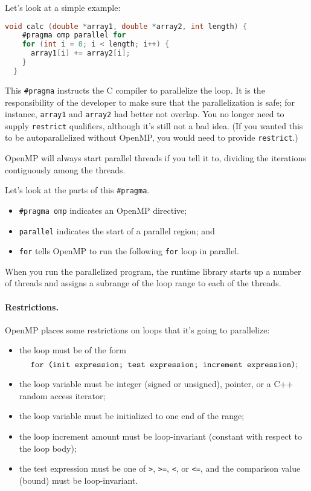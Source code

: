 Let's look at a simple example:
{\small
\begin{lstlisting}[language=C,morekeywords={foreach,pragma,omp,parallel,single,nowait,task,untied,barrier,taskyield}]
  void calc (double *array1, double *array2, int length) {
    #pragma omp parallel for
    for (int i = 0; i < length; i++) {
      array1[i] += array2[i];
    }
  }
\end{lstlisting}
}
This \verb+#pragma+ instructs the C compiler to parallelize the
loop. It is the responsibility of the developer to make sure that
the parallelization is safe; for instance, {\tt array1} and {\tt array2}
had better not overlap. You no longer need to supply {\tt restrict}
qualifiers, although it's still not a bad idea. (If you wanted this
to be autoparallelized without OpenMP, you would need to provide
{\tt restrict}.)

OpenMP will always start parallel threads if you tell it to, dividing
the iterations contiguously among the threads.

Let's look at the parts of this \verb+#pragma+.
\begin{itemize}
\item \verb+#pragma omp+ indicates an OpenMP directive;
\item {\tt parallel} indicates the start of a parallel region; and
\item {\tt for} tells OpenMP to run the following {\tt for} loop in parallel.
\end{itemize}
When you run the parallelized program, the runtime library starts
up a number of threads and assigns a subrange of the loop range to 
each of the threads.

\paragraph{Restrictions.} OpenMP places some restrictions on
loops that it's going to parallelize:
\begin{itemize}
\item the loop must be of the form 
\[ \mbox{\tt for (init expression; test expression; increment expression)}; \]
\item the loop variable must be integer (signed or unsigned), pointer, or a C++
random access iterator;
\item the loop variable must be initialized to one end of the range;
\item the loop increment amount must be loop-invariant (constant with respect to the loop body); 
\item the test expression must be one of {\tt >}, {\tt >=}, {\tt <}, or {\tt <=}, and the comparison value (bound) must be loop-invariant.
\end{itemize}

